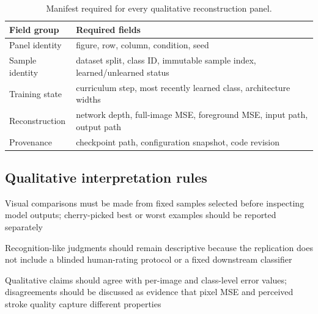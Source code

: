 \begin{table}[htbp]
\centering
\caption{Manifest required for every qualitative reconstruction panel.}
\label{tab:qualitative-manifest}
\scriptsize
\begin{tabularx}{\textwidth}{p{2.8cm}Y}
\toprule
Field group & Required fields \\
\midrule
Panel identity & figure, row, column, condition, seed \\
Sample identity & dataset split, class ID, immutable sample index, learned/unlearned status \\
Training state & curriculum step, most recently learned class, architecture widths \\
Reconstruction & network depth, full-image MSE, foreground MSE, input path, output path \\
Provenance & checkpoint path, configuration snapshot, code revision \\
\bottomrule
\end{tabularx}
\end{table}

\subsection{Qualitative interpretation rules}
\begin{draftpoints}
  \item Visual comparisons must be made from fixed samples selected before inspecting model outputs; cherry-picked best or worst examples should be reported separately
  \item Recognition-like judgments should remain descriptive because the replication does not include a blinded human-rating protocol or a fixed downstream classifier
  \item Qualitative claims should agree with per-image and class-level error values; disagreements should be discussed as evidence that pixel MSE and perceived stroke quality capture different properties
\end{draftpoints}
